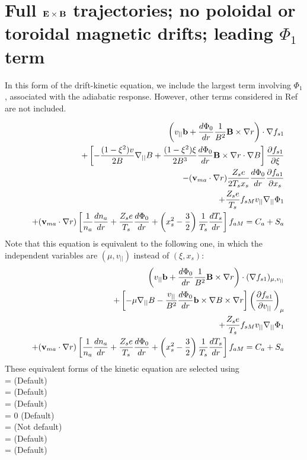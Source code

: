 \section{Full ${\mathbf E}\times{\mathbf B}$ trajectories; no poloidal or toroidal magnetic drifts; leading $\Phi_1$ term}

In this form of the drift-kinetic equation, we include the largest term involving $\Phi_1$,
associated with the adiabatic response.
However, other terms considered in Ref \cite{Regana2013} are not included.

\begin{eqnarray}
&&\left(v_{||}{\mathbf b} + \frac{d\Phi_0}{dr} \frac{1}{B^2} {\mathbf B}\times\nabla r \right) \cdot \nabla f_{s1} \\
&&+ \left[ - \frac{(1-\xi^2)v}{2B} \nabla_{||} B
+\frac{(1-\xi^2)\xi}{2B^3} \frac{d\Phi_0}{dr}{\mathbf B}\times\nabla r\cdot\nabla B \right]
 \frac{\partial f_{s1}}{\partial \xi} \nonumber \\
&&-({\mathbf v}_{ma} \cdot\nabla r) \frac{Z_s e}{2 T_s x_s} \frac{d\Phi_0}{dr} \frac{\partial f_{a1}}{\partial x_s} \nonumber \\
&&+\frac{Z_s e}{T_s} f_{sM} v_{||} \nabla_{||} \Phi_1 \nonumber \\
&&+ ({\mathbf v}_{ma} \cdot \nabla r) \left[ \frac{1}{n_a} \frac{dn_a}{dr} + \frac{Z_s e}{T_s} \frac{d\Phi_0}{dr} + \left(x_s^2-\frac{3}{2}\right) \frac{1}{T_s} \frac{dT_s}{dr}\right] f_{aM}
 = C_a + S_a \nonumber
\end{eqnarray}
Note that this equation is equivalent to the following one, in which the independent variables
are $(\mu,v_{||})$ instead of $(\xi,x_s)$:
\begin{eqnarray}
&&\left(v_{||}{\mathbf b} + \frac{d\Phi_0}{dr} \frac{1}{B^2} {\mathbf B}\times\nabla r \right) \cdot (\nabla f_{s1})_{\mu, v_{||}} \\
&&+ \left[ - \mu \nabla_{||} B
-\frac{v_{||}}{B^2} \frac{d\Phi_0}{dr} {\mathbf b}\times\nabla B \times \nabla r \right]
\left( \frac{\partial f_{a1}}{\partial v_{||}} \right)_{\mu} \nonumber \\
&&+\frac{Z_s e}{T_s} f_{sM} v_{||} \nabla_{||} \Phi_1 \nonumber \\
&& + ({\mathbf v}_{ma} \cdot \nabla r) \left[ \frac{1}{n_a} \frac{dn_a}{dr} + \frac{Z_s e}{T_s} \frac{d\Phi_0}{dr} + \left(x_s^2-\frac{3}{2}\right) \frac{1}{T_s} \frac{dT_s}{dr}\right] f_{aM}
=C_a + S_a \nonumber
\end{eqnarray}
These equivalent forms of the kinetic equation are selected using \\
 = \true  \;\;\; (Default) \\
 = \true \;\;\; (Default) \\
 = \false \;\;\; (Default) \\
 = 0 \;\;\; (Default) \\
 = \true \;\;\; (Not default) \\
 = \false \;\;\; (Default) \\
 = \false \;\;\; (Default)



